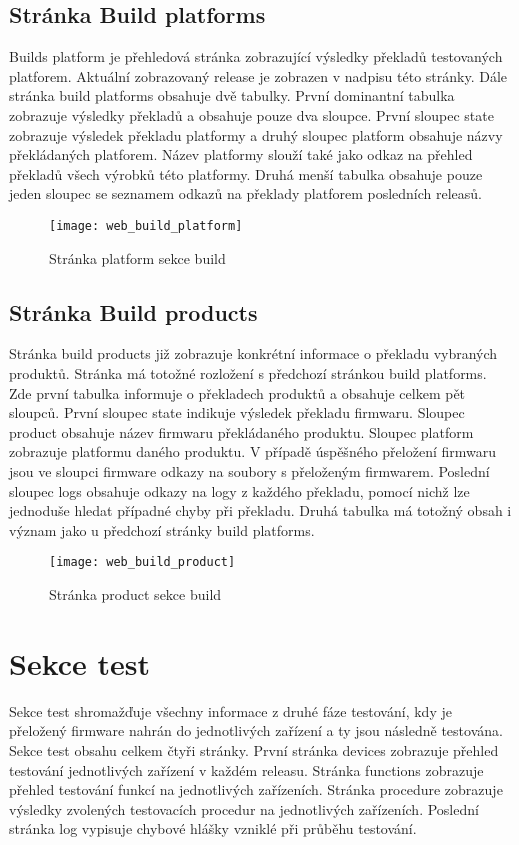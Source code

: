 \subsection{Stránka Build platforms}
Builds platform je přehledová stránka zobrazující výsledky překladů testovaných platforem. Aktuální zobrazovaný release je zobrazen v nadpisu této stránky. Dále stránka build platforms obsahuje dvě tabulky. První dominantní tabulka zobrazuje výsledky překladů a obsahuje pouze dva sloupce. První sloupec state zobrazuje výsledek překladu platformy a druhý sloupec platform obsahuje názvy překládaných platforem. Název platformy slouží také jako odkaz na přehled překladů všech výrobků této platformy. Druhá menší tabulka obsahuje pouze jeden sloupec se seznamem odkazů na překlady platforem posledních releasů.

\begin{figure}[h]
  \centering
  \texttt{[image: web\_build\_platform]}
  \caption{Stránka platform sekce build}
  \label{fig:web_build_platform}
\end{figure}

\subsection{Stránka Build products}
Stránka build products již zobrazuje konkrétní informace o překladu vybraných produktů. Stránka má totožné rozložení s předchozí stránkou build platforms. Zde první tabulka informuje o překladech produktů a obsahuje celkem pět sloupců. První sloupec state indikuje výsledek překladu firmwaru. Sloupec product obsahuje název firmwaru překládaného produktu. Sloupec platform zobrazuje platformu daného produktu. V případě úspěšného přeložení firmwaru jsou ve sloupci firmware odkazy na soubory s přeloženým firmwarem. Poslední sloupec logs obsahuje odkazy na logy z každého překladu, pomocí nichž lze jednoduše hledat případné chyby při překladu. Druhá tabulka má totožný obsah i význam jako u předchozí stránky build platforms.

\begin{figure}[h]
  \centering
  \texttt{[image: web\_build\_product]}
  \caption{Stránka product sekce build}
  \label{fig:web_build_platform}
\end{figure}

\section{Sekce test}
Sekce test shromažďuje všechny informace z druhé fáze testování, kdy je přeložený firmware nahrán do jednotlivých zařízení a ty jsou následně testována. Sekce test obsahu celkem čtyři stránky. První stránka devices zobrazuje přehled testování jednotlivých zařízení v každém releasu. Stránka functions zobrazuje přehled testování funkcí na jednotlivých zařízeních. Stránka procedure zobrazuje výsledky zvolených testovacích procedur na jednotlivých zařízeních. Poslední stránka log vypisuje chybové hlášky vzniklé při průběhu testování.

